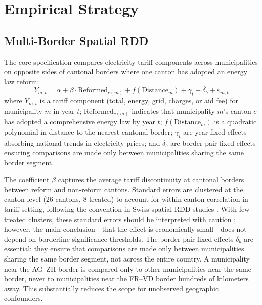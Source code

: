 \documentclass[12pt]{article}
\begin{document}
\section{Empirical Strategy}

\subsection{Multi-Border Spatial RDD}

The core specification compares electricity tariff components across municipalities on opposite sides of cantonal borders where one canton has adopted an energy law reform:
\begin{equation}
Y_{m,t} = \alpha + \beta \cdot \text{Reformed}_{c(m)} + f(\text{Distance}_{m}) + \gamma_t + \delta_b + \varepsilon_{m,t}
\label{eq:rdd}
\end{equation}
where $Y_{m,t}$ is a tariff component (total, energy, grid, charges, or aid fee) for municipality $m$ in year $t$; $\text{Reformed}_{c(m)}$ indicates that municipality $m$'s canton $c$ has adopted a comprehensive energy law by year $t$; $f(\text{Distance}_{m})$ is a quadratic polynomial in distance to the nearest cantonal border; $\gamma_t$ are year fixed effects absorbing national trends in electricity prices; and $\delta_b$ are border-pair fixed effects ensuring comparisons are made only between municipalities sharing the same border segment.

The coefficient $\beta$ captures the average tariff discontinuity at cantonal borders between reform and non-reform cantons. Standard errors are clustered at the canton level (26 cantons, 8 treated) to account for within-canton correlation in tariff-setting, following the convention in Swiss spatial RDD studies \citep{eugster2011demand, egger2015causal}. With few treated clusters, these standard errors should be interpreted with caution \citep{cameron2008bootstrap}; however, the main conclusion---that the effect is economically small---does not depend on borderline significance thresholds. The border-pair fixed effects $\delta_b$ are essential: they ensure that comparisons are made only between municipalities sharing the same border segment, not across the entire country. A municipality near the AG--ZH border is compared only to other municipalities near the same border, never to municipalities near the FR--VD border hundreds of kilometers away. This substantially reduces the scope for unobserved geographic confounders.
\end{document}
